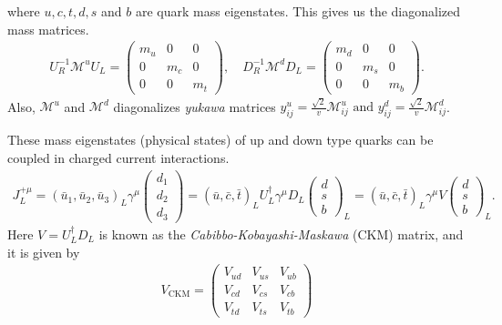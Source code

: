 where $u,c,t,d,s$ and $b$ are quark mass eigenstates. This gives us the diagonalized mass matrices. 
\begin{eqnarray}
U_{R}^{-1} \mathcal{M}^{u} U_{L}=\left(\begin{array}{ccc}{m_{u}} & {0} & {0} \\ {0} & {m_{c}} & {0} \\ {0} & {0} & {m_{t}}\end{array}\right), \quad D_{R}^{-1} \mathcal{M}^{d} D_{L}=\left(\begin{array}{ccc}{m_{d}} & {0} & {0} \\ {0} & {m_{s}} & {0} \\ {0} & {0} & {m_{b}}\end{array}\right).
\end{eqnarray}
Also, $\mathcal{M}^u$ and $\mathcal{M}^d$ diagonalizes \textit{yukawa} matrices $y_{i j}^{u}=\frac{\sqrt{2}}{v} \mathcal{M}_{i j}^{u} \text { and } y_{i j}^{d}=\frac{\sqrt{2}}{v} \mathcal{M}_{i j}^{d}$.\par
These mass eigenstates (physical states) of up and down type quarks can be coupled in charged current interactions.
\begin{eqnarray}
J_{L}^{+\mu}=\left(\bar{u}_{1}, \bar{u}_{2}, \bar{u}_{3}\right)_{L} \gamma^{\mu}\left(\begin{array}{c}{d_{1}} \\ {d_{2}} \\ {d_{3}}\end{array}\right)=(\bar{u}, \bar{c}, \bar{t})_{L} U_{L}^{\dagger} \gamma^{\mu} D_{L}\left(\begin{array}{c}{d} \\ {s} \\ {b}\end{array}\right)_{L}=(\bar{u}, \bar{c}, \bar{t})_{L} \gamma^{\mu} V\left(\begin{array}{c}{d} \\ {s} \\ {b}\end{array}\right)_{L}.
\end{eqnarray} 
Here $V=U_{L}^{\dagger}D_{L}$ is known as the \textit{Cabibbo-Kobayashi-Maskawa} (CKM) matrix, and  it is given by 
\begin{eqnarray}
V_{\text{CKM}}=\left(\begin{array}{ccc}{V_{u d}} & {V_{u s}} & {V_{u b}} \\ {V_{c d}} & {V_{c s}} & {V_{c b}} \\ {V_{t d}} & {V_{t s}} & {V_{t b}}\end{array}\right)
\end{eqnarray}
